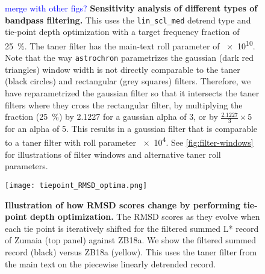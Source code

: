\documentclass[draft]{agujournal2019}
\newcommand{\ijk}{\textcolor{blue}}
\begin{document}
\begin{figure}
{  %
    \ijk{merge with other figs?}
    \textbf{Sensitivity analysis of different types of bandpass filtering.}
    This uses the \texttt{lin\_scl\_med} detrend type and tie-point depth optimization with a target frequency fraction of \qty{25}{\percent}.
    The taner filter has the main-text roll parameter of \num{e10}.
    Note that the way \texttt{astrochron} parametrizes the gaussian (dark red triangles) window width is not directly comparable to the taner (black circles) and rectangular (grey squares) filters.
    Therefore, we have reparametrized the gaussian filter so that it intersects the taner filters where they cross the rectangular filter,
    by multiplying the fraction (\qty{25}{\percent})
    by \num{2.1227} for a gaussian alpha of 3,
    or by \(\frac{2.1227}{3}\times5\) for an alpha of 5.
    This results in a gaussian filter that is comparable to a taner filter with roll parameter \num{e4}.
    See \cref{fig:filter-windows} for illustrations of filter windows and alternative taner roll parameters.
    }
\end{figure}


\begin{figure}
  \centering \texttt{[image: tiepoint\_RMSD\_optima.png]}
  \caption{\label{fig:tiepoint-RMSD-optima}
    \textbf{Illustration of how RMSD scores change by performing tie-point depth optimization.}
    The \gls{RMSD} scores as they evolve when each tie point is iteratively shifted for the filtered summed \gls{L*} record of Zumaia (top panel) against ZB18a.
    We show the filtered summed record (black) versus ZB18a (yellow).
    This uses the taner filter from the main text on the piecewise linearly detrended record.
    }
\end{figure}
\end{document}
